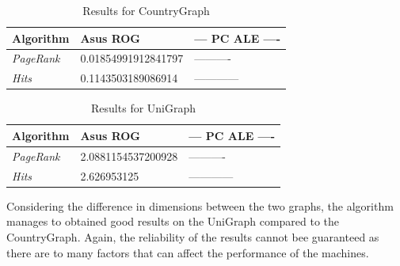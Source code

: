   \begin{table}[!ht]
    \centering
    \begin{tabular}{l|ll}
    \rowcolor[HTML]{FFFFFF} 
    \textbf{Algorithm}            & \textbf{Asus ROG}   & \textbf{--- PC ALE ----} \\ \hline
    \textit{PageRank}             & 0.01854991912841797 & ----------               \\
    \textit{Hits}                 & 0.1143503189086914  & ------------             \\
    \end{tabular}
    \caption{Results for CountryGraph}
  \end{table}
  \begin{table}[!ht]
    \centering
    \begin{tabular}{l|ll}
    \rowcolor[HTML]{FFFFFF} 
    \textbf{Algorithm}            & \textbf{Asus ROG}   & \textbf{--- PC ALE ----} \\ \hline
    \textit{PageRank}             & 2.0881154537200928 & ----------               \\
    \textit{Hits}                 & 2.626953125  & ------------             \\
    \end{tabular}
    \caption{Results for UniGraph}
  \end{table}

  Considering the difference in dimensions between the two graphs, the algorithm manages to obtained 
  good results on the UniGraph compared to the CountryGraph. Again, the reliability of the results cannot 
  bee guaranteed as there are to many factors that can affect the performance of the machines.


